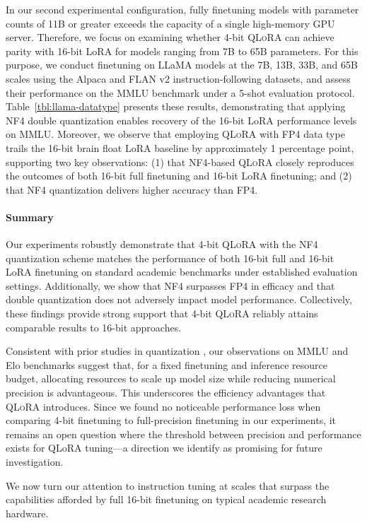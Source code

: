 In our second experimental configuration, fully finetuning models with parameter counts of 11B or greater exceeds the capacity of a single high-memory GPU server. Therefore, we focus on examining whether 4-bit \textsc{QLoRA} can achieve parity with 16-bit LoRA for models ranging from 7B to 65B parameters. For this purpose, we conduct finetuning on LLaMA models at the 7B, 13B, 33B, and 65B scales using the Alpaca and FLAN v2 instruction-following datasets, and assess their performance on the MMLU benchmark under a 5-shot evaluation protocol. Table~\ref{tbl:llama-datatype} presents these results, demonstrating that applying NF4 double quantization enables recovery of the 16-bit LoRA performance levels on MMLU. Moreover, we observe that employing \textsc{QLoRA} with FP4 data type trails the 16-bit brain float LoRA baseline by approximately 1 percentage point, supporting two key observations: (1) that NF4-based \textsc{QLoRA} closely reproduces the outcomes of both 16-bit full finetuning and 16-bit LoRA finetuning; and (2) that NF4 quantization delivers higher accuracy than FP4.

\paragraph{Summary} Our experiments robustly demonstrate that 4-bit \textsc{QLoRA} with the NF4 quantization scheme matches the performance of both 16-bit full and 16-bit LoRA finetuning on standard academic benchmarks under established evaluation settings. Additionally, we show that NF4 surpasses FP4 in efficacy and that double quantization does not adversely impact model performance. Collectively, these findings provide strong support that 4-bit \textsc{QLoRA} reliably attains comparable results to 16-bit approaches.

Consistent with prior studies in quantization \citep{dettmers2022case}, our observations on MMLU and Elo benchmarks suggest that, for a fixed finetuning and inference resource budget, allocating resources to scale up model size while reducing numerical precision is advantageous. This underscores the efficiency advantages that \textsc{QLoRA} introduces. Since we found no noticeable performance loss when comparing 4-bit finetuning to full-precision finetuning in our experiments, it remains an open question where the threshold between precision and performance exists for QLoRA tuning—a direction we identify as promising for future investigation.

We now turn our attention to instruction tuning at scales that surpass the capabilities afforded by full 16-bit finetuning on typical academic research hardware.

